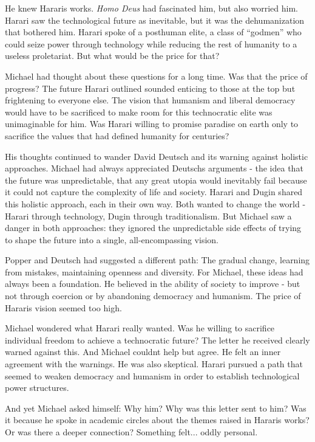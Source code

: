 \documentclass[
]{article}
\begin{document}
He knew Harari\textquotesingle s works. \emph{Homo Deus} had fascinated
him, but also worried him. Harari saw the technological future as
inevitable, but it was the dehumanization that bothered him. Harari
spoke of a posthuman elite, a class of ``godmen'' who could seize power
through technology while reducing the rest of humanity to a useless
proletariat. But what would be the price for that?

Michael had thought about these questions for a long time. Was that the
price of progress? The future Harari outlined sounded enticing to those
at the top but frightening to everyone else. The vision that humanism
and liberal democracy would have to be sacrificed to make room for this
technocratic elite was unimaginable for him. Was Harari willing to
promise paradise on earth only to sacrifice the values
\hspace{0pt}\hspace{0pt}that had defined humanity for centuries?

His thoughts continued to wander David Deutsch and its warning against
holistic approaches. Michael had always appreciated
Deutsch\textquotesingle s arguments - the idea that the future was
unpredictable, that any great utopia would inevitably fail because it
could not capture the complexity of life and society. Harari and Dugin
shared this holistic approach, each in their own way. Both wanted to
change the world - Harari through technology, Dugin through
traditionalism. But Michael saw a danger in both approaches: they
ignored the unpredictable side effects of trying to shape the future
into a single, all-encompassing vision.

Popper and Deutsch had suggested a different path: The gradual change,
learning from mistakes, maintaining openness and diversity. For Michael,
these ideas had always been a foundation. He believed in the ability of
society to improve - but not through coercion or by abandoning democracy
and humanism. The price of Harari\textquotesingle s vision seemed too
high.

Michael wondered what Harari really wanted. Was he willing to sacrifice
individual freedom to achieve a technocratic future? The letter he
received clearly warned against this. And Michael
couldn\textquotesingle t help but agree. He felt an inner agreement with
the warnings. He was also skeptical. Harari pursued a path that seemed
to weaken democracy and humanism in order to establish technological
power structures.

And yet Michael asked himself: Why him? Why was this letter sent to him?
Was it because he spoke in academic circles about the themes raised in
Harari\textquotesingle s works? Or was there a deeper connection?
Something felt... oddly personal.
\end{document}
